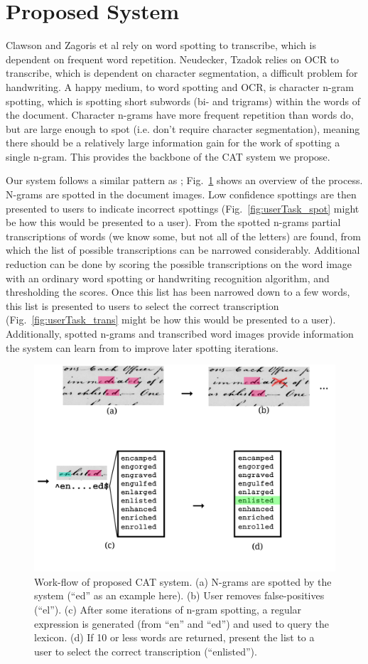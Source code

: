 \documentclass[conference]{IEEEtran}
\begin{document}
\section{Proposed System}
Clawson\cite{Clawson2014} and Zagoris et al\cite{Zagoris2015} rely on word spotting to transcribe, which is dependent on frequent word repetition. Neudecker, Tzadok\cite{Neudecker2010} relies on OCR to transcribe, which is dependent on character segmentation, a difficult problem for handwriting.
A happy medium, to word spotting and OCR, is character n-gram spotting, which is spotting short subwords (bi- and trigrams) within the words of the document. Character n-grams have more frequent repetition than words do, but are large enough to spot (i.e. don't require character segmentation), meaning there should be a relatively large information gain for the work of spotting a single n-gram. This provides the backbone of the CAT system we propose.


Our system follows a similar pattern as \cite{Neudecker2010}; Fig.~\ref{fig:system_diagram} shows an overview of the process. N-grams are spotted in the document images. Low confidence spottings are then presented to users to indicate incorrect spottings (Fig.~\ref{fig:userTask_spot} might be how this would be presented to a user). From the spotted n-grams partial transcriptions of words (we know some, but not all of the letters) are found, from which the list of possible transcriptions can be narrowed considerably. Additional reduction can be done by scoring the possible transcriptions on the word image with an ordinary word spotting or handwriting recognition algorithm, and thresholding the scores. Once this list has been narrowed down to a few words, this list is presented to users to select the correct transcription (Fig.~\ref{fig:userTask_trans} might be how this would be presented to a user). Additionally, spotted n-grams and transcribed word images provide information the system can learn from to improve later spotting iterations.

\begin{figure}
    \centering
    \includegraphics[width=.45\textwidth]{flow5}
    \caption{Work-flow of proposed CAT system. (a) N-grams are spotted by the system (``ed'' as an example here). (b) User removes false-positives (``el''). (c) After some iterations of n-gram spotting, a regular expression is generated (from ``en'' and ``ed'') and used to query the lexicon. (d) If 10 or less words are returned, present the list to a user to select the correct transcription (``enlisted'').}
    \label{fig:system_diagram}
\end{figure}
\end{document}
